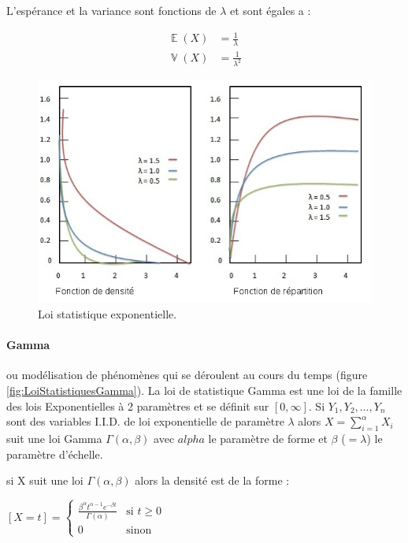\documentclass[a4paper,12pt]{report}
\DeclareMathOperator{\E}{\mathbb{E}} %
\DeclareMathOperator{\V}{\mathbb{V}} %
\theoremstyle{plain}				%
\theoremstyle{definition}				%
\begin{document}
L’espérance et la variance sont fonctions de $\lambda$ et sont égales a :

\begin{align*}
	\E(X) &= \frac{1}{\lambda} \\
	\V(X) &= \frac{1}{\lambda ^2}
\end{align*} 


\begin{figure}
{\centering
\includegraphics[width=\columnwidth]{loiStatExponentielle.png}
\caption{Loi statistique exponentielle.}
\label{fig:LoiStatistiquesExponentielle}
\par}
\end{figure}

\paragraph{Gamma}
ou modélisation de phénomènes qui se déroulent au cours du temps (figure \ref{fig:LoiStatistiquesGamma}). 
La loi de statistique Gamma est une loi de la famille des lois Exponentielles à 2 paramètres 
  et se définit sur $[0, \infty]$.
Si $Y_1, Y_2, \ldots, Y_n$ sont des variables I.I.D. 
  de loi exponentielle de paramètre $\lambda$ alors $X=\sum_{ i= 1}^{\alpha} X_i$  
  suit une loi Gamma $\Gamma(\alpha, \beta)$ avec 
    $alpha$ le paramètre de forme et 
    $\beta$ ($=\lambda$) le paramètre d'échelle. 
  
si X suit une loi $\Gamma(\alpha, \beta)$ alors la densité est de la forme :

  \begin{center}
  $[X=t] = \left\{
    \begin{array}{ll}
    	\frac{\beta^{\alpha} t^{\alpha-1} e^{-\beta t}}{\Gamma(\alpha)}  & 
    	\mbox{si } t \geq 0  \\
        0 & 
        \mbox{sinon}
    \end{array}
	\right.$
  \label{definitionLoiGammaDensite}
  \end{center}
   
\end{document}
